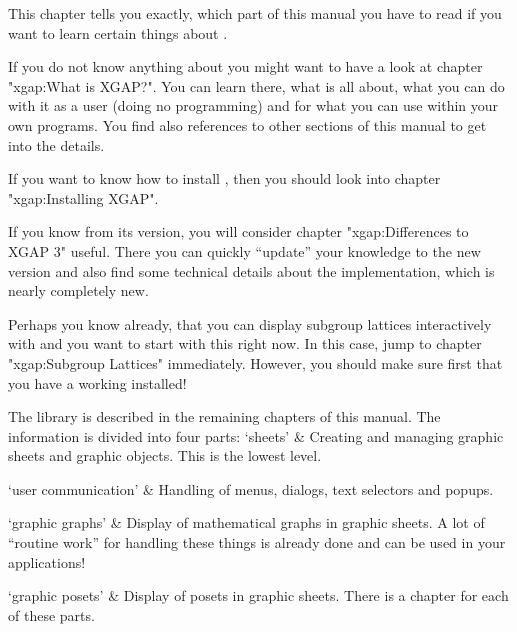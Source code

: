 
This chapter tells you exactly, which part of this manual you have to read
if you want to learn certain things about \XGAP.

If you do not know anything about {\XGAP} you might want to have a look at
chapter "xgap:What is XGAP?". You can learn there, what {\XGAP} is all
about, what you can do with it as a user (doing no programming) and for
what you can use {\XGAP} within your own programs. You find also references
to other sections of this manual to get into the details.

If you want to know how to install \XGAP, then you should look into 
chapter "xgap:Installing XGAP".

If you know {\XGAP} from its  version, you will consider chapter
"xgap:Differences to XGAP 3" useful. There you can quickly ``update'' your
knowledge to the new  version and also find some technical details
about the implementation, which is nearly completely new.

Perhaps you know already, that you can display subgroup lattices
interactively with {\XGAP} and you want to start with this right now. In
this case, jump to chapter "xgap:Subgroup Lattices"
immediately. However, you should make sure first that you have a working
{\XGAP} installed! 

The {\XGAP} library is described in the remaining chapters of this
manual. The information is divided into four parts:
\beginitems
`sheets' &
  Creating and managing graphic sheets and graphic objects. This is the
  lowest level.

`user communication' &
  Handling of menus, dialogs, text selectors and popups.

`graphic graphs' &
  Display of mathematical graphs in graphic sheets. A lot of ``routine
  work'' for handling these things is already done and can be used in
  your applications!

`graphic posets' &
  Display of posets in graphic sheets.
\enditems
There is a chapter for each of these parts.



